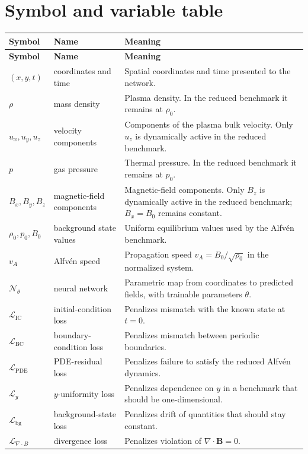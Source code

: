 \documentclass[11pt]{article}
\newcommand{\Bvec}{\mathbf{B}}
\begin{document}
\section{Symbol and variable table}
\begin{longtable}{>{\raggedright\arraybackslash}p{} >{\raggedright\arraybackslash}p{} >{\raggedright\arraybackslash}p{}}
\toprule
\textbf{Symbol} & \textbf{Name} & \textbf{Meaning} \\
\midrule
\endfirsthead
\toprule
\textbf{Symbol} & \textbf{Name} & \textbf{Meaning} \\
\midrule
\endhead
$(x,y,t)$ & coordinates and time & Spatial coordinates and time presented to the network. \\
$\rho$ & mass density & Plasma density. In the reduced benchmark it remains at $\rho_0$. \\
$u_x,u_y,u_z$ & velocity components & Components of the plasma bulk velocity. Only $u_z$ is dynamically active in the reduced benchmark. \\
$p$ & gas pressure & Thermal pressure. In the reduced benchmark it remains at $p_0$. \\
$B_x,B_y,B_z$ & magnetic-field components & Magnetic-field components. Only $B_z$ is dynamically active in the reduced benchmark; $B_x=B_0$ remains constant. \\
$\rho_0,p_0,B_0$ & background state values & Uniform equilibrium values used by the Alfv\'en benchmark. \\
$v_A$ & Alfv\'en speed & Propagation speed $v_A=B_0/\sqrt{\rho_0}$ in the normalized system. \\
$\mathcal{N}_{\theta}$ & neural network & Parametric map from coordinates to predicted fields, with trainable parameters $\theta$. \\
$\mathcal{L}_{\mathrm{IC}}$ & initial-condition loss & Penalizes mismatch with the known state at $t=0$. \\
$\mathcal{L}_{\mathrm{BC}}$ & boundary-condition loss & Penalizes mismatch between periodic boundaries. \\
$\mathcal{L}_{\mathrm{PDE}}$ & PDE-residual loss & Penalizes failure to satisfy the reduced Alfv\'en dynamics. \\
$\mathcal{L}_{y}$ & $y$-uniformity loss & Penalizes dependence on $y$ in a benchmark that should be one-dimensional. \\
$\mathcal{L}_{\mathrm{bg}}$ & background-state loss & Penalizes drift of quantities that should stay constant. \\
$\mathcal{L}_{\nabla\cdot B}$ & divergence loss & Penalizes violation of $\nabla\cdot\Bvec=0$. \\
\bottomrule
\end{longtable}
\end{document}
